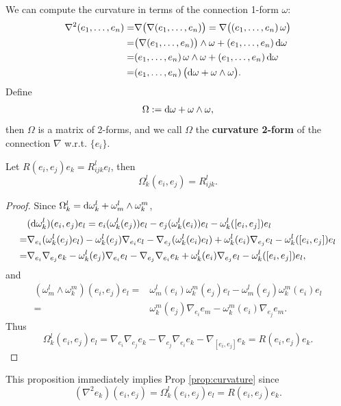 We can compute the curvature in terms of the connection 1-form $\omega$:
\begin{align*}
    \nabla^2 ({e}_{1},\dots,{e}_{n}) =& \nabla\big(\nabla({e}_{1},\dots,{e}_{n})\big) 
    = \nabla\big(({e}_{1},\dots,{e}_{n})\,\omega\big) \\
    =& \big(\nabla({e}_{1},\dots,{e}_{n})\big)\wedge \omega + ({e}_{1},\dots,{e}_{n})\, {\rm d}\omega \\
    =& ({e}_{1},\dots,{e}_{n})\,\omega\wedge \omega + ({e}_{1},\dots,{e}_{n})\, {\rm d}\omega \\
    =& ({e}_{1},\dots,{e}_{n})\,\big({\rm d}\omega + \omega\wedge \omega\big).
\end{align*}
Define 
\begin{equation}\label{eq:curvature-form}
    \Omega := {\rm d}\omega + \omega\wedge \omega,
\end{equation}
then $\Omega$ is a matrix of 2-forms, and we call 
$\Omega$ the \textbf{curvature 2-form} of the connection $\nabla$ w.r.t. $\{e_i\}$. 
\begin{proposition}
    Let $R(e_i,e_j)e_k = R_{ijk}^l e_l$, then
    \begin{equation*}
        \Omega_k^l(e_i,e_j) = R_{ijk}^l.
    \end{equation*}
\end{proposition}
\begin{proof}
    Since $\Omega_k^l = {\rm d}\omega_k^l + \omega_m^l \wedge \omega_k^m$, 
    \begin{align*}
        &({\rm d}\omega^l_k)(e_i,e_j)e_l = e_i(\omega_k^l(e_j))e_l - e_j(\omega_k^l(e_i))e_l - \omega_k^l([e_i,e_j])e_l \\
        =& \nabla_{e_i}(\omega_k^l(e_j)e_l) - \omega_k^l(e_j)\nabla_{e_i} e_l - \nabla_{e_j}(\omega_k^l(e_i)e_l) + \omega_k^l(e_i)\nabla_{e_j} e_l - \omega_k^l([e_i,e_j])e_l \\
        =& \nabla_{e_i} \nabla_{e_j} e_k - \omega_k^l(e_j)\nabla_{e_i} e_l - \nabla_{e_j} \nabla_{e_i} e_k + \omega_k^l(e_i)\nabla_{e_j} e_l - \omega_k^l([e_i,e_j])e_l,
    \end{align*}
    and 
    \begin{align*}
        (\omega_m^l \wedge \omega_k^m)(e_i,e_j)e_l =& \omega_m^l(e_i)\omega_k^m(e_j)e_l - \omega_m^l(e_j)\omega_k^m(e_i)e_l \\
        =& \omega^m_k(e_j)\nabla_{e_i} e_m - \omega^m_k(e_i)\nabla_{e_j} e_m.
    \end{align*}
    Thus 
    \begin{equation*}
        \Omega_k^l(e_i,e_j)e_l 
        = \nabla_{e_i}\nabla_{e_j}e_k - \nabla_{e_j}\nabla_{e_i}e_k - \nabla_{[e_i,e_j]}e_k = R(e_i,e_j)e_k.
    \end{equation*}
\end{proof}
\begin{corollary}
    This proposition immediately implies Prop \ref{prop:curvature} since
    \begin{equation*}
        (\nabla^2 e_k)(e_i,e_j) = \Omega_k^l(e_i,e_j)e_l = R(e_i,e_j)e_k. 
    \end{equation*}
\end{corollary}

